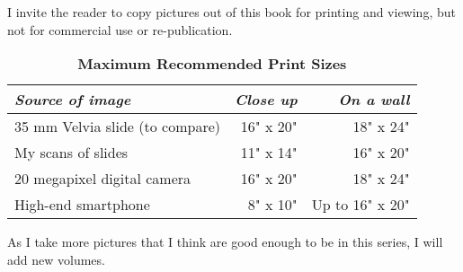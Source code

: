 I invite the reader to copy pictures out of this book for printing and viewing, but not for commercial use or re-publication. 

\begin{table}
\centering
\captionsetup{labelformat=empty}
\caption{\textbf{Maximum Recommended Print Sizes}}
\begin{tabular}{lrr}
\hline
\emph{Source of image}                                  & \emph{Close up} & \emph{On a wall} \\
\hline
35 mm Velvia slide (to compare) & 16" x 20" & 18" x 24" \\
My scans of slides                            & 11" x 14"  & 16" x 20"  \\
20 megapixel digital camera             & 16" x 20"  & 18" x 24"  \\
High-end smartphone                      & 8" x 10"   & Up to 16" x 20"  \\
\hline
\end{tabular}
\end{table}

As I take more pictures that I think are good enough to be in this series, I will add new volumes.
